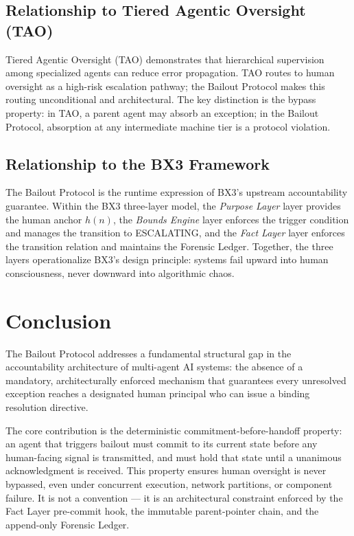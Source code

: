 \documentclass[12pt]{article}
\newcommand{\purpose}{\textit{Purpose Layer}}
\newcommand{\bounds}{\textit{Bounds Engine}}
\newcommand{\fact}{\textit{Fact Layer}}
\begin{document}
\subsection{Relationship to Tiered Agentic Oversight (TAO)}
Tiered Agentic Oversight (TAO) \citep{kim2025} demonstrates that hierarchical supervision among specialized agents can reduce error propagation. TAO routes to human oversight as a high-risk escalation pathway; the Bailout Protocol makes this routing unconditional and architectural. The key distinction is the bypass property: in TAO, a parent agent may absorb an exception; in the Bailout Protocol, absorption at any intermediate machine tier is a protocol violation.

\subsection{Relationship to the BX3 Framework}
The Bailout Protocol is the runtime expression of BX3's upstream accountability guarantee. Within the BX3 three-layer model, the \purpose{} layer provides the human anchor $h(n)$, the \bounds{} layer enforces the trigger condition and manages the transition to ESCALATING, and the \fact{} layer enforces the transition relation and maintains the Forensic Ledger. Together, the three layers operationalize BX3's design principle: systems fail upward into human consciousness, never downward into algorithmic chaos.

\section{Conclusion}\label{sec:conclusion}
The Bailout Protocol addresses a fundamental structural gap in the accountability architecture of multi-agent AI systems: the absence of a mandatory, architecturally enforced mechanism that guarantees every unresolved exception reaches a designated human principal who can issue a binding resolution directive.

The core contribution is the deterministic commitment-before-handoff property: an agent that triggers bailout must commit to its current state before any human-facing signal is transmitted, and must hold that state until a unanimous acknowledgment is received. This property ensures human oversight is never bypassed, even under concurrent execution, network partitions, or component failure. It is not a convention --- it is an architectural constraint enforced by the Fact Layer pre-commit hook, the immutable parent-pointer chain, and the append-only Forensic Ledger.
\end{document}
